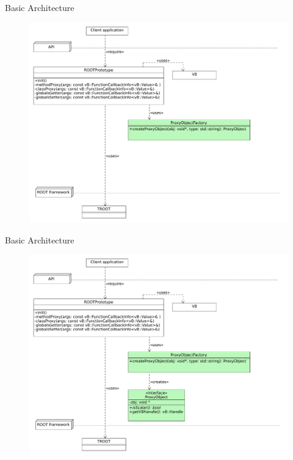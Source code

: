 \begin{frame}{Basic Architecture}
  \begin{figure}[htb]
    \centering
      \includegraphics[width=\textwidth, height=.85\textheight, keepaspectratio]{./resources/architecture/architecture_h3.pdf}
  \end{figure}
\end{frame}

\begin{frame}{Basic Architecture}
  \begin{figure}[htb]
    \centering
      \includegraphics[width=\textwidth, height=.85\textheight, keepaspectratio]{./resources/architecture/architecture_h4.pdf}
  \end{figure}
\end{frame}

